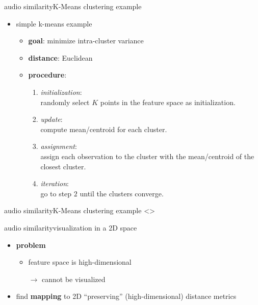         \begin{frame}{audio similarity}{K-Means clustering example}
            \begin{itemize}
                \item   simple k-means example
                    \begin{itemize}
                        \item   \textbf{goal}: minimize intra-cluster variance
                        \item   \textbf{distance}: Euclidean
                        \item   \textbf{procedure}:
                            \begin{enumerate}
                                \item	\textit{initialization}:\\ randomly select $K$ points in the feature space as initialization.
                                \item<2->	\textit{update}:\\ compute mean/centroid for each cluster.
                                \item<3->	\textit{assignment}:\\ assign each observation to the cluster with the mean/centroid of the closest cluster.
                                \item<4->	\textit{iteration}:\\ go to step $2$ until the clusters converge.
                            \end{enumerate}
                    \end{itemize}
            \end{itemize}
        \end{frame}
        \begin{frame}{audio similarity}{K-Means clustering example}
            \setcounter{i}{0}
            \setcounter{j}{1}
            {
                \only<\value{j}>{}
            }
        \end{frame}
        \begin{frame}{audio similarity}{visualization in a 2D space}
            \begin{itemize}
                \item \textbf{problem}
                    \begin{itemize}
                        \item   feature space is high-dimensional
                        \item[$\rightarrow$] cannot be visualized
                    \end{itemize}
                \bigskip
                \item<2-> find \textbf{mapping} to 2D ``preserving'' (high-dimensional) distance metrics
            \end{itemize}
        \end{frame}
            
